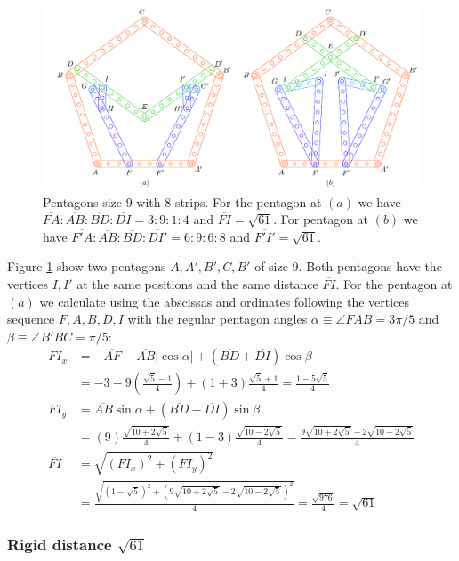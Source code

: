 \documentclass[11pt]{article}
\begin{document}
\begin{figure}[h]
 \centering
 \includegraphics[scale=0.95]{9/penta9-8b}
 \caption{Pentagons size 9 with 8 strips. For the pentagon at $(a)$ we have $\overline{FA}:\overline{AB}:\overline{BD}:\overline{DI} = 3:9:1:4$ and $\overline{FI} = \sqrt{61}$. For pentagon at $(b)$ we have $\overline{F'A}:\overline{AB}:\overline{BD}:\overline{DI'} = 6:9:6:8$ and $\overline{F'I'}=\sqrt{61}$.}
 \label{fig:penta9-8b}
\end{figure}

Figure \ref{fig:penta9-8b} show two pentagons $A,A',B',C,B'$ of size $9$. Both pentagons have the vertices $I,I'$ at the same positions and the same distance $\overline{FI}$. For the pentagon at $(a)$ we calculate using the abscissas and ordinates following the vertices sequence $F,A,B,D,I$ with the regular pentagon angles $\alpha \equiv \angle{FAB} = 3\pi/5$ and $\beta \equiv \angle{B'BC} = \pi/5$:
\begin{align}
FI_x &= -\overline{AF} - \overline{AB}|\cos\alpha| + (\overline{BD} + \overline{DI})\cos\beta\nonumber\\
 &= -3 - 9\left(\frac{\sqrt5-1}4\right) + (1+3)\frac{\sqrt5+1}4 = \frac{1-5\sqrt5}4\\
FI_y &= \overline{AB}\sin\alpha + (\overline{BD}-\overline{DI})\sin\beta\nonumber\\
 &= (9)\frac{\sqrt{10+2\sqrt5}}4 + (1-3)\frac{\sqrt{10-2\sqrt5}}4
 = \frac{9\sqrt{10+2\sqrt5} - 2\sqrt{10-2\sqrt5}}4\\
\overline{FI} &= \sqrt{(FI_x)^2 + (FI_y)^2}\nonumber\\
 &= \frac{\sqrt{(1-\sqrt5)^2 + (9\sqrt{10+2\sqrt5} - 2\sqrt{10-2\sqrt5})^2}}4
 = \frac{\sqrt{976}}4 = \sqrt{61}
\end{align}

\subsubsection{Rigid distance $\sqrt{61}$}
\end{document}
